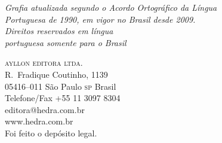 \vfill

\textit{Grafia atualizada segundo o Acordo Ortográfico da Língua\\
Portuguesa de 1990, em vigor no Brasil desde 2009.}\\

\textit{Direitos reservados em língua\\ 
portuguesa somente para o Brasil}\\\medskip

\textsc{ayllon editora ltda.}\\
R.~Fradique Coutinho, 1139\\
05416--011 São Paulo \textsc{sp} Brasil\\
Telefone/Fax +55 11 3097 8304\\\smallskip
editora@hedra.com.br\\
www.hedra.com.br\\
\bigskip
Foi feito o depósito legal.

\endgroup
\pagebreak